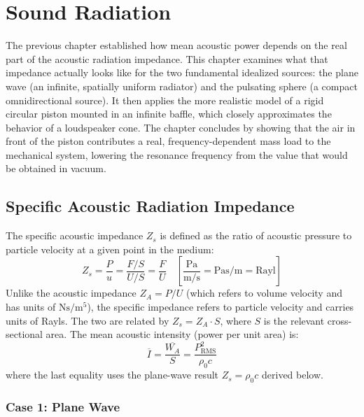 
\graphicspath{{00_Images/06_chapter/}}

\chapter{Sound Radiation}
\label{ch:sound_radiation}

The previous chapter established how mean acoustic power depends on the real part of the acoustic radiation impedance. This chapter examines what that impedance actually looks like for the two fundamental idealized sources: the plane wave (an infinite, spatially uniform radiator) and the pulsating sphere (a compact omnidirectional source). It then applies the more realistic model of a rigid circular piston mounted in an infinite baffle, which closely approximates the behavior of a loudspeaker cone. The chapter concludes by showing that the air in front of the piston contributes a real, frequency-dependent mass load to the mechanical system, lowering the resonance frequency from the value that would be obtained in vacuum.

\section{Specific Acoustic Radiation Impedance}
\label{sc:61}

The specific acoustic impedance \(Z_s\) is defined as the ratio of acoustic pressure to particle velocity at a given point in the medium:
\begin{equation}
    Z_s = \frac{P}{u} = \frac{F/S}{U/S} = \frac{F}{U} \quad \left[\frac{\si{\pascal}}{\si{\meter\per\second}} = \si{\pascal\second\per\meter} = \text{Rayl}\right]
    \label{eq:specificImpedance}
\end{equation}
Unlike the acoustic impedance \(Z_A = P/U\) (which refers to volume velocity and has units of \(\si{\newton\second\per\meter\tothe{5}}\)), the specific impedance refers to particle velocity and carries units of Rayls. The two are related by \(Z_s = Z_A \cdot S\), where \(S\) is the relevant cross-sectional area. The mean acoustic intensity (power per unit area) is:
\[
\overline{I} = \frac{\overline{W_A}}{S} = \frac{P_\mathrm{RMS}^2}{\rho_0 c}
\]
where the last equality uses the plane-wave result \(Z_s = \rho_0 c\) derived below.

\subsection{Case 1: Plane Wave}
\label{ssc:611}


